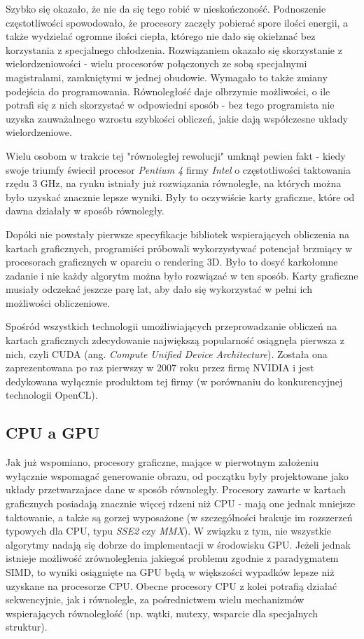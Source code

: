 \documentclass[12pt]{article}
\newcounter{algorytm}
\begin{document}
Szybko się okazało, że nie da się tego robić w nieskończoność. Podnoszenie częstotliwości spowodowało, że procesory zaczęły pobierać spore ilości energii, a także wydzielać ogromne ilości ciepła, którego nie dało się okiełznać bez korzystania z specjalnego chłodzenia. Rozwiązaniem okazało się skorzystanie z wielordzeniowości - wielu procesorów połączonych ze sobą specjalnymi magistralami, zamkniętymi w jednej obudowie. Wymagało to także zmiany podejścia do programowania. Równoległość daje olbrzymie możliwości, o ile potrafi się z nich skorzystać w odpowiedni sposób - bez tego programista nie uzyska zauważalnego wzrostu szybkości obliczeń, jakie dają współczesne układy wielordzeniowe. 

Wielu osobom w trakcie tej "równoległej rewolucji" umknął pewien fakt - kiedy swoje triumfy świecił procesor \textit{Pentium 4} firmy \textit{Intel} o częstotliwości taktowania rzędu 3 GHz, na rynku istniały już rozwiązania równoległe, na których można było uzyskać znacznie lepsze wyniki. Były to oczywiście karty graficzne, które od dawna działały w sposób równoległy. 

Dopóki nie powstały pierwsze specyfikacje bibliotek wspierających obliczenia na kartach graficznych, programiści próbowali wykorzystywać potencjał brzmiący w procesorach graficznych w oparciu o rendering 3D. Było to dosyć karkołomne zadanie i nie każdy algorytm można było rozwiązać w ten sposób. Karty graficzne musiały odczekać jeszcze parę lat, aby dało się wykorzystać w pełni ich możliwości obliczeniowe.

Spośród wszystkich technologii umożliwiających przeprowadzanie obliczeń na kartach graficznych zdecydowanie największą popularność osiągnęła pierwsza z nich, czyli CUDA (ang. \textit{Compute Unified Device Architecture}). Została ona zaprezentowana po raz pierwszy w 2007 roku przez firmę NVIDIA i jest dedykowana wyłącznie produktom tej firmy (w porównaniu do konkurencyjnej technologii OpenCL).

\subsection{CPU a GPU}

Jak już wspomiano, procesory graficzne, mające w pierwotnym założeniu wyłącznie wspomagać generowanie obrazu, od początku były projektowane jako układy przetwarzajace dane w sposób równoległy. Procesory zawarte w kartach graficznych posiadają znacznie więcej rdzeni niż CPU - mają one jednak mniejsze taktowanie, a także są gorzej wyposażone (w szczególności brakuje im rozszerzeń typowych dla CPU, typu \textit{SSE2} czy \textit{MMX}). W związku z tym, nie wszystkie algorytmy nadają się dobrze do implementacji w środowisku GPU. Jeżeli jednak istnieje możliwość zrównoleglenia jakiegoś problemu zgodnie z paradygmatem SIMD, to wyniki osiągnięte na GPU będą w większości wypadków lepsze niż uzyskane na procesorze CPU. Obecne procesory CPU z kolei potrafią działać sekwencyjnie, jak i równolegle, za pośrednictwem wielu mechanizmów wspierających równoległość (np. wątki, mutexy, wsparcie dla specjalnych struktur).
\end{document}
